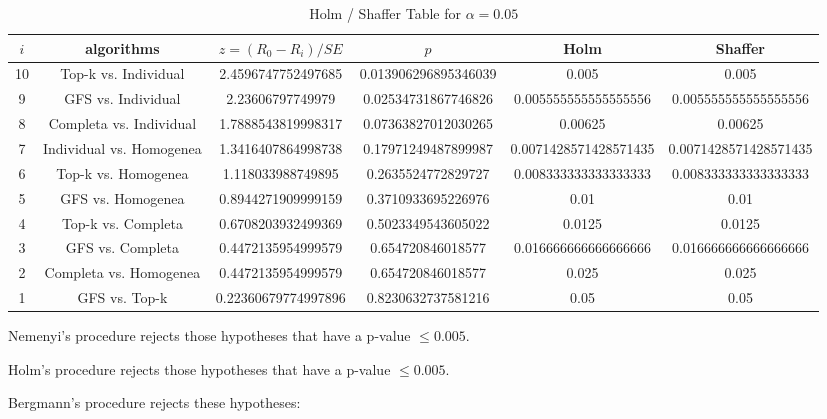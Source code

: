 \documentclass[a4paper,10pt]{article}
\begin{document}
\begin{landscape}
\begin{table}[!htp]
\centering\tiny
\caption{Holm / Shaffer Table for $\alpha=0.05$}
\begin{tabular}{cccccc}
$i$&algorithms&$z=(R_0 - R_i)/SE$&$p$&Holm&Shaffer\\
\hline
10&Top-k vs. Individual&2.4596747752497685&0.013906296895346039&0.005&0.005\\
9&GFS vs. Individual&2.23606797749979&0.02534731867746826&0.005555555555555556&0.005555555555555556\\
8&Completa vs. Individual&1.7888543819998317&0.07363827012030265&0.00625&0.00625\\
7&Individual vs. Homogenea&1.3416407864998738&0.17971249487899987&0.0071428571428571435&0.0071428571428571435\\
6&Top-k vs. Homogenea&1.118033988749895&0.2635524772829727&0.008333333333333333&0.008333333333333333\\
5&GFS vs. Homogenea&0.8944271909999159&0.3710933695226976&0.01&0.01\\
4&Top-k vs. Completa&0.6708203932499369&0.5023349543605022&0.0125&0.0125\\
3&GFS vs. Completa&0.4472135954999579&0.654720846018577&0.016666666666666666&0.016666666666666666\\
2&Completa vs. Homogenea&0.4472135954999579&0.654720846018577&0.025&0.025\\
1&GFS vs. Top-k&0.22360679774997896&0.8230632737581216&0.05&0.05\\
\hline
\end{tabular}
\end{table}
Nemenyi's procedure rejects those hypotheses that have a p-value $\le0.005$.


Holm's procedure rejects those hypotheses that have a p-value $\le0.005$.


Bergmann's procedure rejects these hypotheses:


\begin{itemize}


\end{itemize}



\end{landscape}
\end{document}
